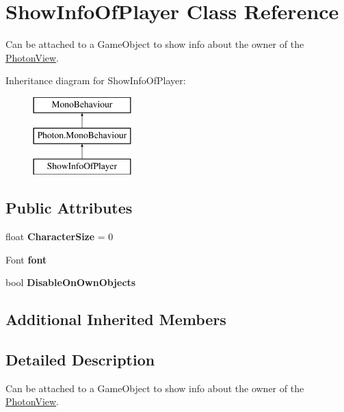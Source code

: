 \hypertarget{class_show_info_of_player}{}\section{Show\+Info\+Of\+Player Class Reference}
\label{class_show_info_of_player}


Can be attached to a Game\+Object to show info about the owner of the \hyperlink{class_photon_view}{Photon\+View}.  


Inheritance diagram for Show\+Info\+Of\+Player\+:\begin{figure}[H]
\begin{center}
\leavevmode
\includegraphics[height=3.000000cm]{class_show_info_of_player}
\end{center}
\end{figure}
\subsection*{Public Attributes}
\begin{DoxyCompactItemize}
\item 
float {\bfseries Character\+Size} = 0\hypertarget{class_show_info_of_player_a3ca691afacbede3ba6003e9fe9382122}{}\label{class_show_info_of_player_a3ca691afacbede3ba6003e9fe9382122}

\item 
Font {\bfseries font}\hypertarget{class_show_info_of_player_ad21009b17d92004b3172cc7e63eac70e}{}\label{class_show_info_of_player_ad21009b17d92004b3172cc7e63eac70e}

\item 
bool {\bfseries Disable\+On\+Own\+Objects}\hypertarget{class_show_info_of_player_a4f3344f49a450e169bce73cb3c1acd42}{}\label{class_show_info_of_player_a4f3344f49a450e169bce73cb3c1acd42}

\end{DoxyCompactItemize}
\subsection*{Additional Inherited Members}


\subsection{Detailed Description}
Can be attached to a Game\+Object to show info about the owner of the \hyperlink{class_photon_view}{Photon\+View}. 

